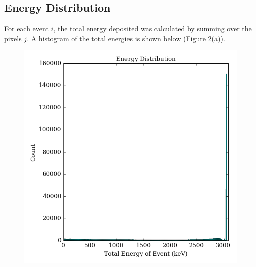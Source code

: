 \documentclass[12pt]{article}
\begin{document}
\subsection{Energy Distribution}

For each event $i$, the total energy deposited was calculated by summing over the pixels $j$. A histogram of the total energies is shown below (Figure 2(a)). 

\begin{center}
\begin{figure}
\includegraphics[scale=0.9]{../energy_distribution.png}


\end{figure}
\end{center}
\end{document}
